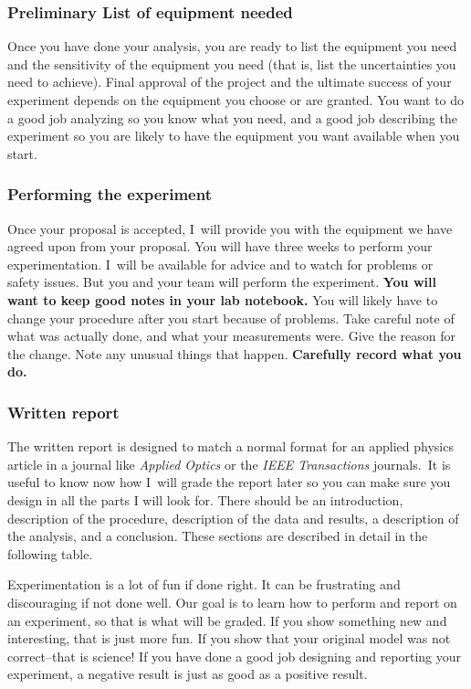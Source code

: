 \documentclass[twoside,11pt,ShortChapTitles]{BYUTextbook}
\begin{document}
\subsubsection{Preliminary List of equipment needed}

Once you have done your analysis, you are ready to list the equipment you
need and the sensitivity of the equipment you need (that is, list the
uncertainties you need to achieve). Final approval of the project and the
ultimate success of your experiment depends on the equipment you choose or
are granted. You want to do a good job analyzing so you know what you need,
and a good job describing the experiment so you are likely to have the
equipment you want available when you start.

\subsubsection{Performing the experiment}

Once your proposal is accepted, I\ will provide you with the equipment we
have agreed upon from your proposal. You will have three weeks to perform
your experimentation. I\ will be available for advice and to watch for
problems or safety issues. But you and your team will perform the
experiment. \textbf{You will want to keep good notes in your lab notebook.}
You will likely have to change your procedure after you start because of
problems. Take careful note of what was actually done, and what your
measurements were. Give the reason for the change. Note any unusual things
that happen. \textbf{Carefully record what you do.}

\subsubsection{Written report}

The written report is designed to match a normal format for an applied
physics article in a journal like \emph{Applied Optics} or the \emph{IEEE
Transactions} journals.\emph{\ }It is useful to know now how I\ will grade
the report later so you can make sure you design in all the parts I will
look for. There should be an introduction, description of the procedure,
description of the data and results, a description of the analysis, and a
conclusion. These sections are described in detail in the following table.

Experimentation is a lot of fun if done right. It can be frustrating and
discouraging if not done well. Our goal is to learn how to perform and
report on an experiment, so that is what will be graded. If you show
something new and interesting, that is just more fun. If you show that your
original model was not correct--that is science! If you have done a good job
designing and reporting your experiment, a negative result is just as good
as a positive result.
\end{document}
